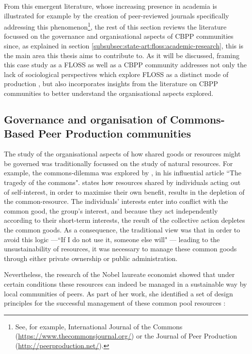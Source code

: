 From this emergent literature, whose increasing presence in academia is illustrated for example by the creation of peer-reviewed journals specifically addressing this phenomenon\footnote{See, for example, International Journal of the Commons (\url{https://www.thecommonsjournal.org/}) or the Journal of Peer Production (\url{http://peerproduction.net/}).}, the rest of this section reviews the literature focussed on the governance and organisational aspects of CBPP communities since, as explained in section \ref{subsubsec:state-art:floss:academic-research}, this is the main area this thesis aims to contribute to. As it will be discussed, framing this case study as a FLOSS as well as a CBPP community addresses not only the lack of sociological perspectives which explore FLOSS as a distinct mode of production \parencite{glaser2007social}, but also incorporates insights from the literature on CBPP communities to better understand the organisational aspects explored.

\subsection{Governance and organisation of Commons-Based Peer Production communities}
\label{subsec:governance-cbpp}

The study of the organisational aspects of how shared goods or resources might be governed was traditionally focussed on the study of natural resources. For example, the commons-dilemma was explored by \textcite{hardin1968tragedy}, in his influential article ``The tragedy of the commons". \textcite{hardin1968tragedy} states how resources shared by individuals acting out of self-interest, in order to maximise their own benefit, results in the depletion of the common-resource. The individuals' interests enter into conflict with the common good, the group's interest, and because they act independently according to their short-term interests, the result of the collective action depletes the common goods. As a consequence, the traditional view was that in order to avoid this logic ---``If I do not use it, someone else will" --- leading to the unsustainability of resources, it was necessary to manage these common goods through either private ownership or public administration. 

Nevertheless, the research of the Nobel laureate economist \textcite{ostrom1990governing} showed that under certain conditions these resources can indeed be managed in a sustainable way by local communities of peers. As part of her work, she identified a set of design principles \parencite[88-102]{ostrom1990governing} for the successful management of these common pool resources \parencite{viegas2007hidden, forte2009decentralization}:

